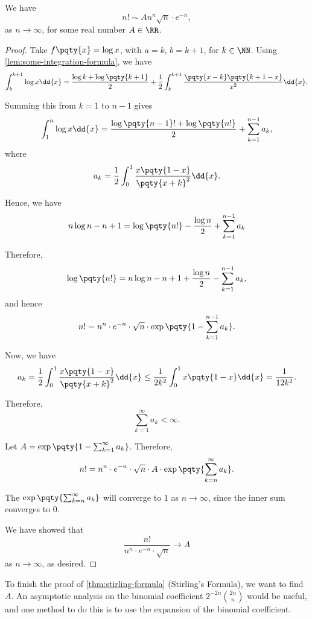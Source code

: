 \begin{lemma}
    \label{lem:stirling-formula-constant}%
    We have
    \[
        n! \sim A n^n \sqrt{n} \cdot e^{-n},
    \]
    as \(n \to \infty\), for some real number \(A \in \RR\).
\end{lemma}

\begin{proof}
    Take \(f\pqty{x} = \log x\), with \(a = k\), \(b = k + 1\), for \(k \in \NN\). Using \autoref{lem:some-integration-formula}, we have
    \[
        \int_{k}^{k + 1} \log x \dd{x} = \frac{\log k + \log\pqty{k + 1}}{2} + \frac{1}{2} \int_{k}^{k + 1} \frac{\pqty{x - k} \pqty{k + 1 - x}}{x^2} \dd{x}.
    \]

    Summing this from \(k = 1\) to \(n - 1\) gives
    \[
        \int_{1}^{n} \log x \dd{x} = \frac{\log \pqty{n - 1}! + \log \pqty{n!}}{2} + \sum_{k = 1}^{n - 1} a_k,
    \]
    where
    \[
        a_k = \frac{1}{2} \int_{0}^{1} \frac{x \pqty{1 - x}}{\pqty{x + k}^2} \dd{x}.
    \]

    Hence, we have
    \[
        n \log n - n + 1 = \log\pqty{n!} - \frac{\log n}{2} + \sum_{k = 1}^{n - 1} a_k
    \]

    Therefore,
    \[
        \log \pqty{n!} = n \log n - n + 1 + \frac{\log n}{2} - \sum_{k = 1}^{n - 1} a_k,
    \]
    and hence
    \[
        n! = n^n \cdot e^{-n} \cdot \sqrt{n} \cdot \exp\pqty{1 - \sum_{k = 1}^{n - 1} a_k}.
    \]

    Now, we have
    \[
        a_k = \frac{1}{2} \int_{0}^{1} \frac{x \pqty{1 - x}}{\pqty{x + k}^2} \dd{x} \leq \frac{1}{2k^2} \int_{0}^{1} x\pqty{1 - x} \dd{x} = \frac{1}{12k^2}.
    \]

    Therefore,
    \[
        \sum_{k = 1}^{\infty} a_k < \infty.
    \]

    Let \(A = \exp\pqty{1 - \sum_{k = 1}^{\infty} a_k}\). Therefore,
    \[
        n! = n^n \cdot e^{-n} \cdot \sqrt{n} \cdot A \cdot \exp\pqty{\sum_{k = n}^{\infty} a_k}.
    \]

    The \(\exp\pqty{\sum_{k = n}^{\infty} a_k}\) will converge to \(1\) as \(n \to \infty\), since the inner sum converges to \(0\).

    We have showed that
    \[
        \frac{n!}{n^n \cdot e^{-n} \cdot \sqrt{n}} \to A
    \]
    as \(n \to \infty\), as desired.
\end{proof}

To finish the proof of \autoref{thm:stirling-formula} (Stirling's Formula), we want to find \(A\). An asymptotic analysis on the binomial coefficient \(2^{-2n} \binom{2n}{n}\) would be useful, and one method to do this is to use the expansion of the binomial coefficient.

